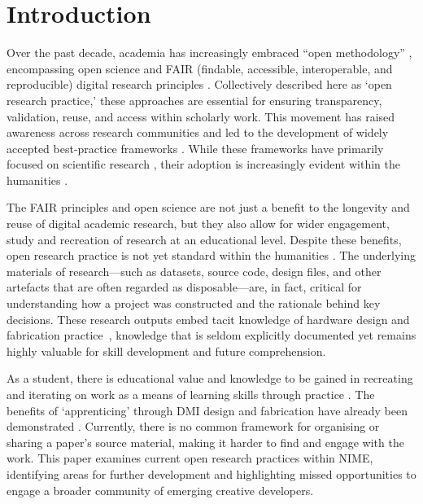 \section{Introduction}

Over the past decade, academia has increasingly embraced ``open methodology'' \cite{nosek_scientific_2012}, encompassing open science \cite{unesco_open_2021} and FAIR (findable, accessible, interoperable, and reproducible) digital research principles \cite{go_fair_2016}.
Collectively described here as `open research practice,' these approaches are essential for ensuring transparency, validation, reuse, and access within scholarly work.
This movement has raised awareness across research communities and led to the development of widely accepted best-practice frameworks \cite{smith_software_2016}.
While these frameworks have primarily focused on scientific research \cite{unesco_open_2021}, their adoption is increasingly evident within the humanities \cite{jensenius_best_2021}.

The FAIR principles and open science are not just a benefit to the longevity and reuse of digital academic research, but they also allow for wider engagement, study and recreation  of research at an educational level.
Despite these benefits, open research practice is not yet standard within the humanities \cite{taylor_shaping_2022}.
The underlying materials of research---such as datasets, source code, design files, and other artefacts that are often regarded as disposable---are, in fact, critical for understanding how a project was constructed and the rationale behind key decisions. These research outputs embed tacit knowledge of hardware design and fabrication practice~\cite{schindler_expertise_2015}, knowledge that is seldom explicitly documented yet remains highly valuable for skill development and future comprehension.

As a student, there is educational value and knowledge to be gained in recreating and iterating on work as a means of learning skills through practice \cite{dasgupta_remixing_2016}.
The benefits of `apprenticing' through DMI design and fabrication have already been demonstrated \cite{nime2021_26}.
Currently, there is no common framework for organising or sharing a paper's source material, making it harder to find and engage with the work. This paper examines current open research practices within NIME, identifying areas for further development and highlighting missed opportunities to engage a broader community of emerging creative developers.

